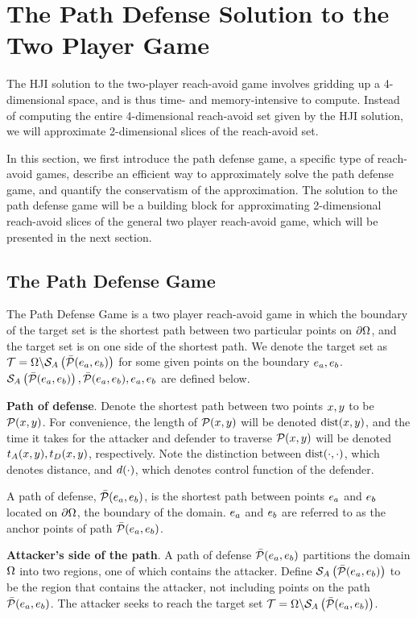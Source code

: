 \section{The Path Defense Solution to the Two Player Game}
\label{sec:path_defense}
The HJI solution to the two-player reach-avoid game involves gridding up a 4-dimensional space, and is thus time- and memory-intensive to compute. Instead of computing the entire 4-dimensional reach-avoid set given by the HJI solution, we will approximate 2-dimensional slices of the reach-avoid set. 

In this section, we first introduce the path defense game, a specific type of reach-avoid games, describe an efficient way to approximately solve the path defense game, and quantify the conservatism of the approximation. The solution to the path defense game will be a building block for approximating 2-dimensional reach-avoid slices of the general two player reach-avoid game, which will be presented in the next section.

\subsection{The Path Defense Game}
The Path Defense Game is a two player reach-avoid game in which the boundary of the target set is the shortest path between two particular points on $\partial\Omega$, and the target set is on one side of the shortest path. We denote the target set as $\mathcal{T}=\Omega\backslash\mathcal{S}_A\left(\bar{\mathcal{P}}(e_a,e_b)\right)$ for some given points on the boundary $e_a,e_b$. $\mathcal{S}_A\left(\bar{\mathcal{P}}(e_a,e_b)\right),\bar{\mathcal{P}}(e_a,e_b),e_a,e_b$ are defined below. 

\begin{defn} %
\textbf{Path of defense}. Denote the shortest path between two points $x,y$ to be $\mathcal{P}(x,y)$. For convenience, the length of $\mathcal{P}(x,y)$ will be denoted $\text{dist}(x,y)$, and the time it takes for the attacker and defender to traverse $\mathcal{P}(x,y)$ will be denoted $t_A(x, y),t_D(x,y)$, respectively. Note the distinction between $\text{dist}(\cdot,\cdot)$, which denotes distance, and $d(\cdot)$, which denotes control function of the defender.

A path of defense, $\bar{\mathcal{P}}(e_a,e_b)$, is the shortest path between points $e_a$ and $e_b$ located on $\partial\Omega$, the boundary of the domain. $e_a$ and $e_b$ are referred to as the anchor points of path $\bar{\mathcal{P}}(e_a,e_b)$. 
\end{defn}

\begin{defn} %
\textbf{Attacker's side of the path}. A path of defense $\bar{\mathcal{P}}(e_a,e_b)$ partitions the domain $\Omega$ into two regions, one of which contains the attacker. Define $\mathcal{S}_A\left(\bar{\mathcal{P}}(e_a,e_b)\right)$ to be the region that contains the attacker, not including points on the path $\bar{\mathcal{P}}(e_a,e_b)$. The attacker seeks to reach the target set $\mathcal{T}=\Omega\backslash\mathcal{S}_A\left(\bar{\mathcal{P}}(e_a,e_b)\right)$.
\end{defn}

